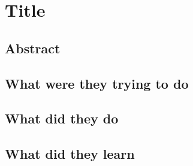 \section{Title}

\subsection{Abstract}

\subsection{What were they trying to do}

\subsection{What did they do}

\subsection{What did they learn}
